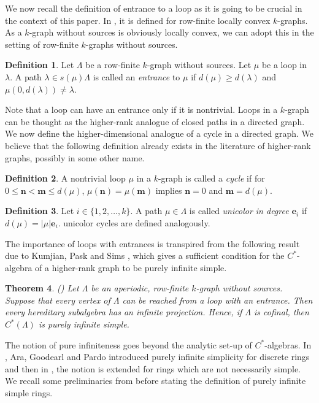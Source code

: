 \documentclass[a4paper,reqno,12pt]{amsart}
\numberwithin{equation}{section}
\newtheorem{thm}{Theorem}[subsection]
\theoremstyle{definition}
\newtheorem{dfn}[thm]{Definition}
\theoremstyle{remark}
\newcommand{\N}{\mathbf{n}}
\newcommand{\M}{\mathbf{m}}
\begin{document}
We now recall the definition of entrance to a loop as it is going to be crucial in the context of this paper. In \cite{KPS}, it is defined for row-finite locally convex $k$-graphs. As a $k$-graph without sources is obviously locally convex, we can adopt this in the setting of row-finite $k$-graphs without sources.
\begin{dfn}\label{def loop with entrance}
Let $\Lambda$ be a row-finite $k$-graph without sources. Let $\mu$ be a loop in $\lambda$. A path $\lambda\in s(\mu)\Lambda$ is called an \emph{entrance} to $\mu$ if $d(\mu)\ge d(\lambda)$ and $\mu(0,d(\lambda))\neq \lambda$. 
\end{dfn}
Note that a loop can have an entrance only if it is nontrivial. Loops in a $k$-graph can be thought as the higher-rank analogue of closed paths in a directed graph. We now define the higher-dimensional analogue of a cycle in a directed graph. We believe that the following definition already exists in the literature of higher-rank graphs, possibly in some other name.  
\begin{dfn}\label{def cycle in a k-graph}
A nontrivial loop $\mu$ in a $k$-graph is called a \emph{cycle} if for $0\le \N<\M\le d(\mu)$, $\mu(\N)=\mu(\M)$ implies $\N=0$ and $\M=d(\mu)$.   
\end{dfn}
\begin{dfn}\label{def length and unicolor path}
Let $i\in \{1,2,\ldots,k\}$. A path $\mu\in \Lambda$ is called \emph{unicolor in degree $\mathbf{e}_i$} if $d(\mu)=|\mu|\mathbf{e}_i$. unicolor cycles are defined analogously.
\end{dfn}
The importance of loops with entrances is transpired from the following result due to Kumjian, Pask and Sims \cite{KPS}, which gives a sufficient condition for the $C^*$-algebra of a higher-rank graph to be purely infinite simple. 
\begin{thm}\label{th pis of C*-algebra}
\textup{(\cite[Theorem 2]{KPS})} Let $\Lambda$ be an aperiodic, row-finite $k$-graph without sources. Suppose that every vertex of $\Lambda$ can be reached from a loop with an entrance. Then every hereditary subalgebra has an infinite projection. Hence, if $\Lambda$ is cofinal, then $C^*(\Lambda)$ is purely infinite simple.
\end{thm} 

The notion of pure infiniteness goes beyond the analytic set-up of $C^*$-algebras. In \cite{AGP}, Ara, Goodearl and Pardo introduced purely infinite simplicity for discrete rings and then in \cite{AGPM}, the notion is extended for rings which are not necessarily simple. We recall some preliminaries from \cite{AGPM} before stating the definition of purely infinite simple rings. 
\end{document}
